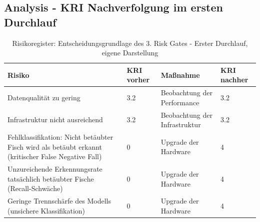 \clearpage %
\newpage

\subsection{Analysis - KRI Nachverfolgung im ersten Durchlauf} 
\label{appendix:cs3_phase3_risiko_verfolgung_1}
\begin{table}[H]
    \label{tab:cs3_phase3_risiko_verfolgung_tabelle_1}
    \centering
    \renewcommand{\arraystretch}{1.3}
    \begin{tabular}{|p{3cm}|p{3cm}|p{3cm}|p{3cm}|}
    \hline
    \textbf{Risiko} & \textbf{KRI vorher} & \textbf{Maßnahme} & \textbf{KRI nachher} \\
    \hline

    Datenqualität zu gering
    & 3.2
    & Beobachtung der Performance
    & 3.2 \\
    \hline

    Infrastruktur nicht ausreichend 
    & 3.2
    & Beobachtung der Infrastruktur
    & 3.2 \\
    \hline

    Fehlklassifikation: Nicht betäubter Fisch wird als betäubt erkannt (kritischer False Negative Fall) 
    & 0
    & Upgrade der Hardware
    & 4  \\
    \hline

    Unzureichende Erkennungsrate tatsächlich betäubter Fische (Recall-Schwäche)
    & 0
    & Upgrade der Hardware
    & 4  \\
    \hline

    Geringe Trennschärfe des Modells (unsichere Klassifikation)
    & 0
    & Upgrade der Hardware
    & 4  \\
    \hline

    \end{tabular}
    \caption{Risikoregister: Entscheidungsgrundlage des 3. Risk Gates - Erster Durchlauf, eigene Darstellung}
\end{table}


\clearpage %

